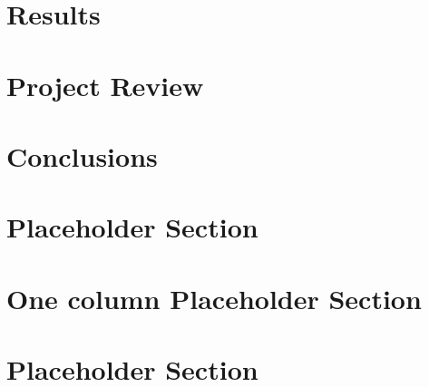 \documentclass{article}
\begin{document}
\section{Results}


\section{Project Review}


\section{Conclusions}






\section{Placeholder Section}


\onecolumn
\section{One column Placeholder Section}

\twocolumn

\section{Placeholder Section}

\end{document}
